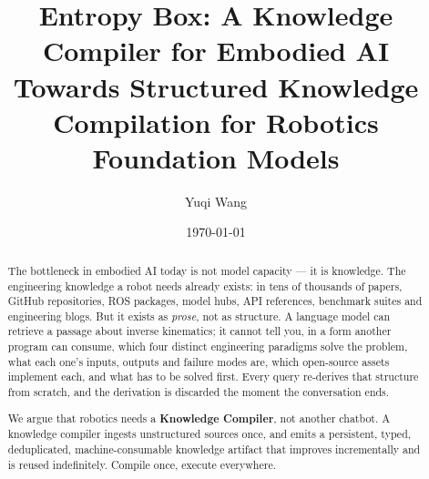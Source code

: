 \documentclass[10pt,a4paper]{article}
\title{\vspace{-1.2cm}\textbf{Entropy Box: A Knowledge Compiler for Embodied AI}\\[0.35em]
\large Towards Structured Knowledge Compilation for Robotics Foundation Models}
\author{Yuqi Wang}
\affil{\small Entropy Box\\
\texttt{wangyuqi11and11@163.com} \quad\textbullet\quad \url{https://chenli-yy.github.io/entropy-box-public/}}
\date{\today}
\begin{document}
\maketitle

\begin{abstract}
\noindent
The bottleneck in embodied AI today is not model capacity --- it is knowledge.
The engineering knowledge a robot needs already exists: in tens of thousands of
papers, GitHub repositories, ROS packages, model hubs, API references, benchmark
suites and engineering blogs. But it exists as \emph{prose}, not as structure. A
language model can retrieve a passage about inverse kinematics; it cannot tell
you, in a form another program can consume, which four distinct engineering
paradigms solve the problem, what each one's inputs, outputs and failure modes
are, which open-source assets implement each, and what has to be solved first.
Every query re-derives that structure from scratch, and the derivation is
discarded the moment the conversation ends.

We argue that robotics needs a \textbf{Knowledge Compiler}, not another chatbot.
A knowledge compiler ingests unstructured sources once, and emits a persistent,
typed, deduplicated, machine-consumable knowledge artifact that improves
incrementally and is reused indefinitely. Compile once, execute everywhere.


\end{abstract}
\end{document}
